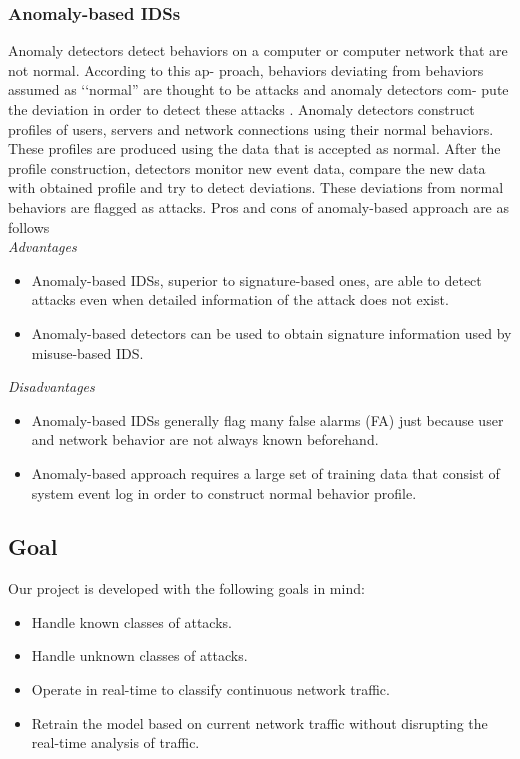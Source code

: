 \documentclass[12pt]{article}
\theoremstyle{definition}
\begin{document}
			\subsubsection{Anomaly-based IDSs}
			Anomaly detectors detect behaviors on a computer or computer network that are not normal. According to this ap-
			proach, behaviors deviating from behaviors assumed as ‘‘normal” are thought to be attacks and anomaly detectors com-
			pute the deviation in order to detect these attacks \cite{Gong2016}. Anomaly detectors construct profiles of users, servers and network
			connections using their normal behaviors. These profiles are produced using the data that is accepted as normal. After
			the profile construction, detectors monitor new event data, compare the new data with obtained profile and try to detect
			deviations. These deviations from normal behaviors are flagged as attacks. Pros and cons of anomaly-based approach are as follows\\
			\textit{Advantages}
			\begin{itemize}
				\item Anomaly-based IDSs, superior to signature-based ones, are able to detect attacks even when detailed information of the attack does not exist.
				\item Anomaly-based detectors can be used to obtain signature information used by misuse-based IDS.
			\end{itemize} 
		
			\textit{Disadvantages}
			\begin{itemize}
				\item Anomaly-based IDSs generally flag many false alarms (FA) just because user and network behavior are not always known beforehand.
				\item Anomaly-based approach requires a large set of training data that consist of system event log in order to construct normal behavior profile.
			\end{itemize}
			
		\subsection{Goal}\label{intro:goal}
		Our project is developed with the following goals in mind:
		
		\begin{itemize}
			\item Handle known classes of attacks.
			\item Handle unknown classes of attacks.
			\item Operate in real-time to classify continuous network traffic.
			\item Retrain the model based on current network traffic without disrupting the real-time analysis of traffic.
		\end{itemize}
	
\end{document}
